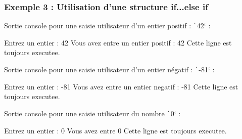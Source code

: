 \documentclass[10pt]{article}
\begin{document}
\subsubsection{Exemple 3 : Utilisation d'une structure if...else if}

\label{exempleStrucIfElseIf}

\bigskip
Sortie console pour une saisie utilisateur d'un entier positif : \texttt`42`  :

\begin{textcode}
    Entrez un entier : 42
    Vous avez entre un entier positif : 42
    Cette ligne est toujours executee.
\end{textcode}

Sortie console pour une saisie utilisateur d'un entier négatif : \texttt`-81`  :

\begin{textcode}
    Entrez un entier : -81
    Vous avez entre un entier negatif : -81
    Cette ligne est toujours executee.
\end{textcode}

Sortie console pour une saisie utilisateur du nombre \texttt`0` :

\begin{textcode}
    Entrez un entier : 0
    Vous avez entre 0
    Cette ligne est toujours executee.
\end{textcode}
\end{document}

